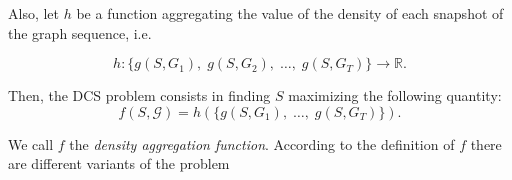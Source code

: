 Also, let $h$ be a function aggregating the value of the density of
each snapshot of the graph sequence, i.e.\

\begin{equation*}
	h: \{ g(S, G_1), \; g(S, G_2), \; \dots, \; g(S, G_T)\} \rightarrow
	\mathbb{R}.
\end{equation*}

Then, the \acrshort{DCS} problem consists in finding $S$ maximizing the
following quantity:
\begin{equation*}
	f(S, \mathcal{G} ) = h(\{g(S, G_1 ), \; \dots, \; g(S, G_T) \}).
\end{equation*}

We call $f$ the \emph{density aggregation function}. According to the
definition of $f$ there are different variants
of the problem

